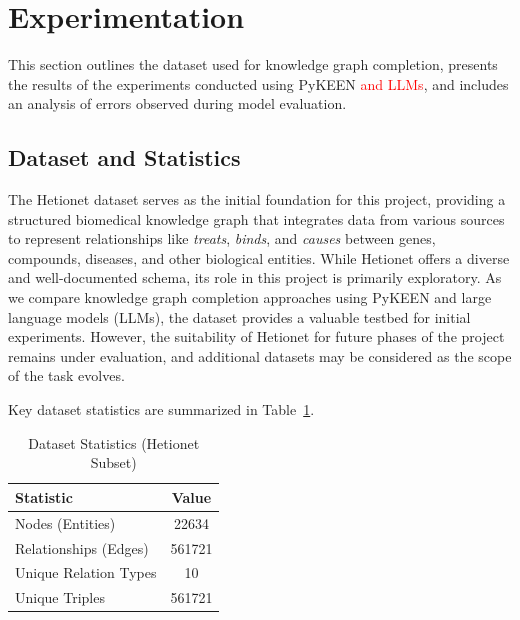 \section*{Experimentation}


This section outlines the dataset used for knowledge graph completion, presents the results of the experiments conducted using PyKEEN \textcolor{red}{and LLMs}, and includes an analysis of errors observed during model evaluation.

\subsection*{Dataset and Statistics}


The Hetionet dataset \cite{hetionet} serves as the initial foundation for this project, providing a structured biomedical knowledge graph that integrates data from various sources to represent relationships like \textit{treats}, \textit{binds}, and \textit{causes} between genes, compounds, diseases, and other biological entities. While Hetionet offers a diverse and well-documented schema, its role in this project is primarily exploratory. As we compare knowledge graph completion approaches using PyKEEN and large language models (LLMs), the dataset provides a valuable testbed for initial experiments. However, the suitability of Hetionet for future phases of the project remains under evaluation, and additional datasets may be considered as the scope of the task evolves.

Key dataset statistics are summarized in Table~\ref{tab:dataset_stats}.

\begin{table}[ht]
    \centering
    \caption{Dataset Statistics (Hetionet Subset)}
    \begin{tabular}{l c}
        \hline
        \textbf{Statistic}    & \textbf{Value} \\
        \hline
        Nodes (Entities)      & 22634          \\ %
        Relationships (Edges) & 561721         \\ %
        Unique Relation Types & 10             \\ %
        Unique Triples        & 561721         \\ %
        \hline
    \end{tabular}
    \label{tab:dataset_stats}
\end{table}

